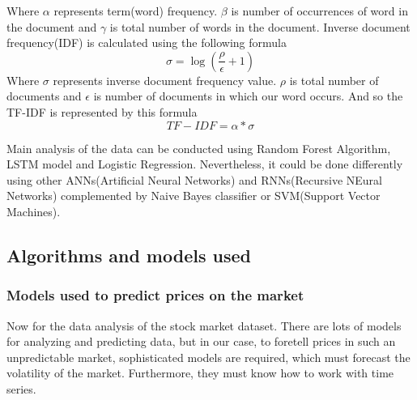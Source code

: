 \documentclass[10pt,twoside,english,a4paper]{article}
\begin{document}
Where $\alpha$ represents term(word) frequency. $\beta$ is number of occurrences of word in the document and $\gamma$ is total number of words in the document.
\newline
Inverse document frequency(IDF) is calculated using the following formula
\[ \sigma = \log (\frac{\rho}{\epsilon} + 1)\]
Where $\sigma$ represents inverse document frequency value. $\rho$ is total number of documents and $\epsilon$ is number of documents in which our word occurs. 
\newline 
And so the TF-IDF is represented by this formula
\[ TF-IDF = \alpha*\sigma\]
\par Main analysis of the data can be  conducted using Random Forest Algorithm, LSTM model and Logistic Regression. Nevertheless, it could be done differently using other ANNs(Artificial Neural Networks) and RNNs(Recursive NEural Networks) complemented by Naive Bayes classifier or SVM(Support Vector Machines).

\subsection{Algorithms and models used}
\subsubsection {Models used to predict prices on the market} 

Now for the data analysis of the stock market dataset. There are lots of models for analyzing and predicting data, but in our case, to foretell prices in such an unpredictable market, sophisticated models are required, which must forecast the volatility of the market. Furthermore, they must know how to work with time series.
\end{document}
